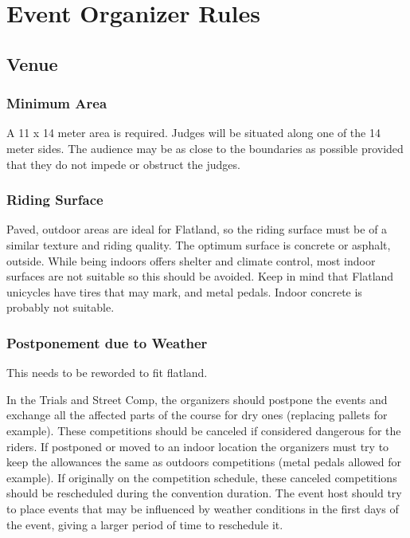 \chapter{Event Organizer Rules}

\section{Venue}

\subsection{Minimum Area \label{sec:flat-street_flatland-performing-area}}
A 11 x 14 meter area is required.
Judges will be situated along one of the 14 meter sides.
The audience may be as close to the boundaries as possible provided that they do not impede or obstruct the judges.

\subsection{Riding Surface}
Paved, outdoor areas are ideal for Flatland, so the riding surface must be of a similar texture and riding quality.
The optimum surface is concrete or asphalt, outside.
While being indoors offers shelter and climate control, most indoor surfaces are not suitable so this should be avoided.
Keep in mind that Flatland unicycles have tires that may mark, and metal pedals. Indoor concrete is probably not suitable.

\subsection{Postponement due to Weather}

\begin{framed}
This needs to be reworded to fit flatland.
\end{framed}

In the Trials and Street Comp, the organizers should postpone the events and exchange all the affected parts of the course for dry ones (replacing pallets for example).
These competitions should be canceled if considered dangerous for the riders.
If postponed or moved to an indoor location the organizers must try to keep the allowances the same as outdoors competitions (metal pedals allowed for example).
If originally on the competition schedule, these canceled competitions should be rescheduled during the convention duration.
The event host should try to place events that may be influenced by weather conditions in the first days of the event, giving a larger period of time to reschedule it.

